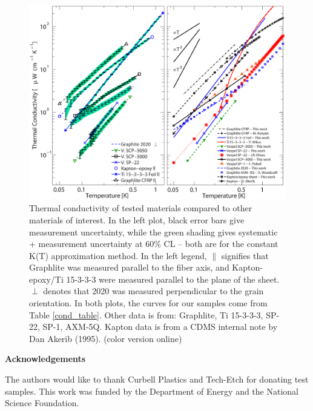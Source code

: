 \documentclass[final]{svjour2}
\begin{document}
\begin{figure}[h]
\includegraphics[width = .984\textwidth,trim = 0 0 0 1.25cm]{K_plots_3.eps}
\caption{{\small Thermal conductivity of tested materials compared to other materials of interest. In the left plot, black error bars give measurement uncertainty, while the green shading gives systematic + measurement uncertainty at 60\% CL -- both are for the constant K(T) approximation method. In the left legend, $\parallel$ signifies that Graphlite was measured parallel to the fiber axis, and Kapton-epoxy/Ti 15-3-3-3 were measured parallel to the plane of the sheet. $\perp$ denotes that 2020 was measured perpendicular to the grain orientation. In both plots, the curves for our samples come from Table \ref{cond_table}. Other data is from: Graphlite\cite{Runyan2008}, Ti 15-3-3-3\cite{Wikus2010}, SP-22\cite{Olson1993}, SP-1\cite{Pobell1992}, AXM-5Q\cite{Woodcraft2009}. Kapton data is from a CDMS internal note by Dan Akerib (1995). (color version online)}}
\label{plots}
\end{figure}

\bigskip

\noindent \textbf{Acknowledgements}

\noindent The authors would like to thank Curbell Plastics and Tech-Etch for donating test samples. This work was funded by the Department of Energy and the National Science Foundation.
\end{document}
